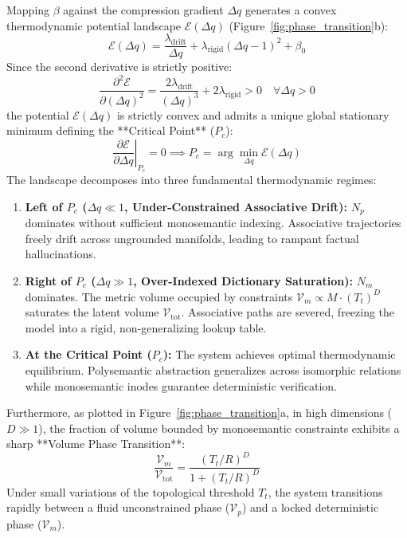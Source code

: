 \documentclass[11pt,a4paper]{article}
\theoremstyle{definition}
\begin{document}
Mapping $\beta$ against the compression gradient $\Delta q$ generates a convex thermodynamic potential landscape $\mathcal{E}(\Delta q)$ (Figure~\ref{fig:phase_transition}b):
\begin{equation}
    \mathcal{E}(\Delta q) = \frac{\lambda_{\mathrm{drift}}}{\Delta q} + \lambda_{\mathrm{rigid}} (\Delta q - 1)^2 + \beta_0
    \label{eq:potential_landscape}
\end{equation}
Since the second derivative is strictly positive:
\begin{equation}
    \frac{\partial^2 \mathcal{E}}{\partial (\Delta q)^2} = \frac{2 \lambda_{\mathrm{drift}}}{(\Delta q)^3} + 2 \lambda_{\mathrm{rigid}} > 0 \quad \forall \Delta q > 0
\end{equation}
the potential $\mathcal{E}(\Delta q)$ is strictly convex and admits a unique global stationary minimum defining the **Critical Point** ($P_c$):
\begin{equation}
    \left. \frac{\partial \mathcal{E}}{\partial \Delta q} \right|_{P_c} = 0 \implies P_c = \arg\min_{\Delta q} \mathcal{E}(\Delta q)
\end{equation}
The landscape decomposes into three fundamental thermodynamic regimes:
\begin{enumerate}[leftmargin=*, itemsep=1.5pt]
    \item \textbf{Left of $P_c$ ($\Delta q \ll 1$, Under-Constrained Associative Drift):} $N_p$ dominates without sufficient monosemantic indexing. Associative trajectories freely drift across ungrounded manifolds, leading to rampant factual hallucinations.
    \item \textbf{Right of $P_c$ ($\Delta q \gg 1$, Over-Indexed Dictionary Saturation):} $N_m$ dominates. The metric volume occupied by constraints $\mathcal{V}_m \propto M \cdot (T_t)^D$ saturates the latent volume $\mathcal{V}_{\mathrm{tot}}$. Associative paths are severed, freezing the model into a rigid, non-generalizing lookup table.
    \item \textbf{At the Critical Point ($P_c$):} The system achieves optimal thermodynamic equilibrium. Polysemantic abstraction generalizes across isomorphic relations while monosemantic inodes guarantee deterministic verification.
\end{enumerate}

Furthermore, as plotted in Figure~\ref{fig:phase_transition}a, in high dimensions ($D \gg 1$), the fraction of volume bounded by monosemantic constraints exhibits a sharp **Volume Phase Transition**:
\begin{equation}
    \frac{\mathcal{V}_m}{\mathcal{V}_{\mathrm{tot}}} = \frac{(T_t / R)^D}{1 + (T_t / R)^D}
\end{equation}
Under small variations of the topological threshold $T_t$, the system transitions rapidly between a fluid unconstrained phase ($\mathcal{V}_p$) and a locked deterministic phase ($\mathcal{V}_m$).
\end{document}
